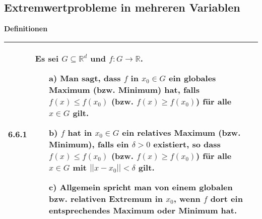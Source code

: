 \subsection{Extremwertprobleme in mehreren Variablen}

    \noindent
    \textbf{Definitionen}
    \begin{table}[H]  
    \begin{tabularx}{\textwidth}{X m{16cm}}
        \toprule

        6.6.1 & Es sei $G \subseteq \mathbb{R}^d$ und $f: G \rightarrow \mathbb{R}$.
                \begin{itemize}[topsep=-0.5cm]
                    \item[a)] Man sagt, dass $f$ in $x_0 \in G$ ein globales Maximum (bzw. Minimum) hat, falls  $f(x) \leq f(x_0)$
                                (bzw. $f(x) \geq f(x_0)$) für alle $x \in G$ gilt.
                    \item[b)] $f$ hat in $x_0 \in G$ ein relatives Maximum (bzw. Minimum), falls ein $\delta > 0$ existiert, so dass
                                $f(x) \leq f(x_0)$ (bzw. $f(x) \geq f(x_0)$) für alle $x \in G$ mit $||x-x_0|| < \delta$ gilt.
                    \item[c)] Allgemein spricht man von einem globalen bzw. relativen Extremum in $x_0$, wenn $f$ dort ein entsprechendes
                                Maximum oder Minimum hat.  
                \end{itemize} \vspace{-0cm} \\ 

        \bottomrule

    \end{tabularx}
    \end{table}

